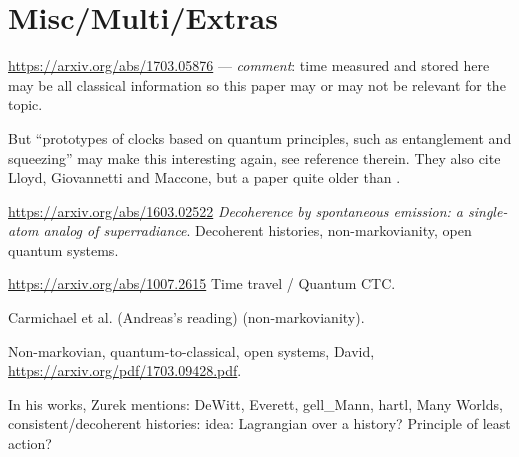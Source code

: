 \section{Misc/Multi/Extras}

\url{https://arxiv.org/abs/1703.05876}
--- \emph{comment}: time measured and stored here
may be all classical information
so this paper may or may not be relevant for the topic.

But
``prototypes of clocks based on quantum principles,
such as entanglement and squeezing''
may make this interesting again, see reference therein.
They also cite Lloyd, Giovannetti and Maccone,
but a paper quite older than \cite{Lloyd:Time}.

\url{https://arxiv.org/abs/1603.02522}
\emph{Decoherence by spontaneous emission: a single-atom analog of superradiance}.
Decoherent histories, non-markovianity, open quantum systems.

\url{https://arxiv.org/abs/1007.2615} Time travel / Quantum CTC.

Carmichael et al. \cite{CarmichaelOQS2017} (Andreas's reading)
(non-markovianity).

Non-markovian, quantum-to-classical, open systems, David,
\url{https://arxiv.org/pdf/1703.09428.pdf}.

In his works, Zurek mentions:
DeWitt, Everett, gell_Mann, hartl, Many Worlds, consistent/decoherent histories:
idea: Lagrangian over a history? Principle of least action?
